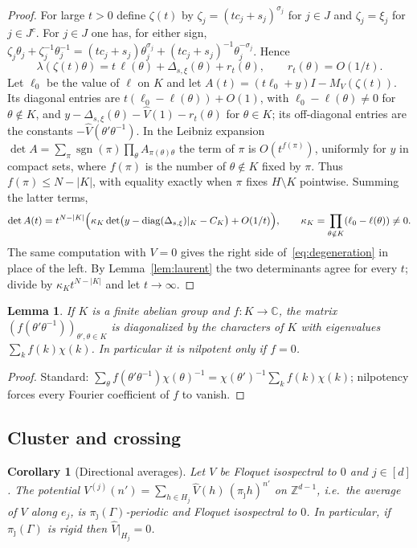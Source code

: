 \documentclass[11pt,reqno]{amsart}
\newtheorem{lemma}[theorem]{Lemma}
\newtheorem{corollary}[theorem]{Corollary}
\theoremstyle{definition}
\theoremstyle{remark}
\newcommand{\C}{\mathbb C}
\newcommand{\Z}{\mathbb Z}
\DeclareMathOperator{\diag}{diag}
\begin{document}
\begin{proof}
For large $t>0$ define $\zeta(t)$ by $\zeta_j=(tc_j+s_j)^{\sigma_j}$ for $j\in J$
and $\zeta_j=\xi_j$ for $j\in J^c$.  For $j\in J$ one has, for either sign,
$\zeta_j\theta_j+\zeta_j^{-1}\theta_j^{-1}=(tc_j+s_j)\theta_j^{\sigma_j}+(tc_j+s_j)^{-1}\theta_j^{-\sigma_j}$.
Hence
\[
 \lambda(\zeta(t)\theta)=t\,\ell(\theta)+\Delta_{s,\xi}(\theta)+r_t(\theta),\qquad r_t(\theta)=O(1/t).
\]
Let $\ell_0$ be the value of $\ell$ on $K$ and let
$A(t)=(t\ell_0+y)I-M_V(\zeta(t))$.  Its diagonal entries are
$t(\ell_0-\ell(\theta))+O(1)$, with $\ell_0-\ell(\theta)\ne0$ for $\theta\notin K$,
and $y-\Delta_{s,\xi}(\theta)-\widehat V(1)-r_t(\theta)$ for $\theta\in K$; its
off-diagonal entries are the constants $-\widehat V(\theta'\theta^{-1})$.  In the
Leibniz expansion $\det A=\sum_\pi\operatorname{sgn}(\pi)\prod_\theta A_{\pi(\theta)\theta}$
the term of $\pi$ is $O(t^{f(\pi)})$, uniformly for $y$ in compact sets, where
$f(\pi)$ is the number of $\theta\notin K$ fixed by $\pi$.  Thus $f(\pi)\le N-|K|$,
with equality exactly when $\pi$ fixes $H\setminus K$ pointwise.  Summing the
latter terms,
\[
 \det A(t)=t^{N-|K|}\Bigl(\kappa_K\det\bigl(y-\diag(\Delta_{s,\xi})|_K-C_K\bigr)+O(1/t)\Bigr),
 \qquad \kappa_K=\prod_{\theta\notin K}(\ell_0-\ell(\theta))\ne0 .
\]
The same computation with $V=0$ gives the right side of~\eqref{eq:degeneration}
in place of the left.  By Lemma~\ref{lem:laurent} the two determinants agree
for every $t$; divide by $\kappa_Kt^{N-|K|}$ and let $t\to\infty$.
\end{proof}

\begin{lemma}\label{lem:convolution}
If $K$ is a finite abelian group and $f\colon K\to\C$, the matrix
$(f(\theta'\theta^{-1}))_{\theta',\theta\in K}$ is diagonalized by the characters
of $K$ with eigenvalues $\sum_kf(k)\chi(k)$.  In particular it is nilpotent only
if $f=0$.
\end{lemma}

\begin{proof}
Standard: $\sum_{\theta}f(\theta'\theta^{-1})\chi(\theta)^{-1}=\chi(\theta')^{-1}\sum_k f(k)\chi(k)$;
nilpotency forces every Fourier coefficient of $f$ to vanish.
\end{proof}

\subsection{Cluster and crossing}

\begin{corollary}[Directional averages]\label{cor:cluster}
Let $V$ be Floquet isospectral to $0$ and $j\in[d]$.  The potential
$V^{(j)}(n')=\sum_{h\in H_j}\widehat V(h)\,(\pi_{\hat\jmath}h)^{n'}$ on $\Z^{d-1}$,
i.e.\ the average of $V$ along $e_j$, is $\pi_{\hat\jmath}(\Gamma)$-periodic and
Floquet isospectral to $0$.  In particular, if $\pi_{\hat\jmath}(\Gamma)$ is
rigid then $\widehat V|_{H_j}=0$.
\end{corollary}
\end{document}
